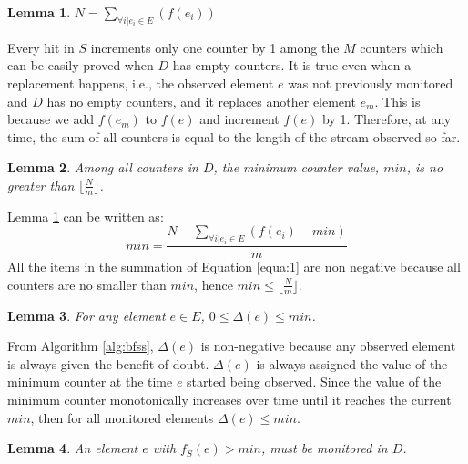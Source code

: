 \documentclass[conference]{IEEEtran}
\begin{document}
\newtheorem{lemma}{Lemma}
\begin{lemma}\label{lem:1}
  $N=\sum_{\forall i|e_i \in E}(f(e_i))$
\end{lemma}

\begin{IEEEproof}
Every hit in $S$ increments only one counter by 1 among the $M$ counters which can be easily proved when $D$ has empty counters. It is true even when a replacement happens, i.e., the observed element $e$ was not previously monitored and $D$ has no empty counters, and it replaces another element $e_m$. This is because we add $f(e_m)$ to $f(e)$ and increment $f(e)$ by 1. Therefore, at any time, the sum of all counters is equal to the length of the stream observed so far.
\end{IEEEproof}


\begin{lemma} \label{lem:2}
Among all counters in $D$, the minimum counter value, $min$, is no greater than $\lfloor\frac{N}{m}\rfloor$.
\end{lemma}

\begin{IEEEproof}
Lemma \ref{lem:1} can be written as:
\begin{equation}\label{equa:1}
	min=\frac{N-\sum_{\forall i|e_i \in E}(f(e_i)-min)}{m}
\end{equation}
\indent All the items in the summation of Equation \ref{equa:1} are non negative because all counters are no smaller than $min$, hence $min\leq\lfloor \frac{N}{m}\rfloor$.
\end{IEEEproof}

\begin{lemma}\label{lem:3}
	For any element $e \in E$, $0 \leq \Delta(e) \leq min$. 
\end{lemma}

\begin{IEEEproof}
From Algorithm \ref{alg:bfss}, $\Delta(e)$ is non-negative because any observed element is always given the benefit of doubt. $\Delta(e)$ is always assigned the value of the minimum counter at the time $e$ started being observed. Since the value of the minimum counter monotonically increases over time until it reaches the current $min$, then for all monitored elements $\Delta(e) \leq min$.
\end{IEEEproof}

\begin{lemma}\label{lem:4}
	An element $e$ with $f_S(e)> min$, must be monitored in $D$.
\end{lemma}
\end{document}
